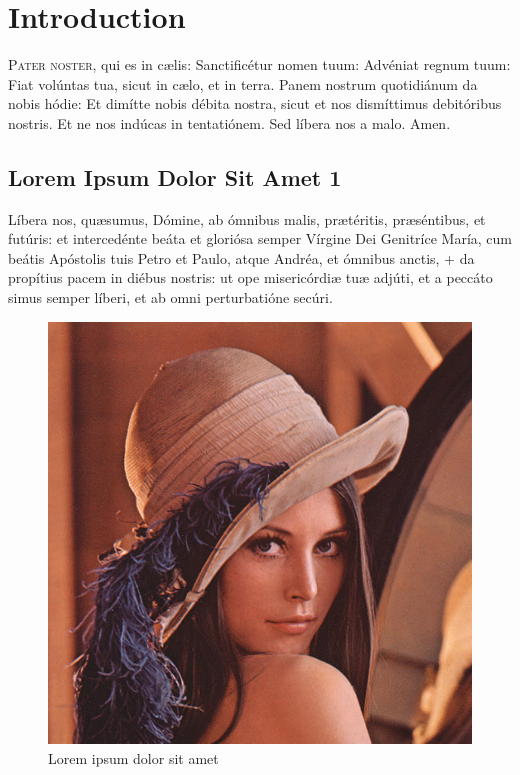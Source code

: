 \chapter{Introduction}\label{chap:introduction}

\lettrine{P}{ater noster}, qui es in cælis: Sanctificétur nomen tuum: Advéniat regnum tuum: Fiat volúntas tua, sicut in cælo, et in terra. Panem nostrum quotidiánum da nobis hódie: Et dimítte nobis débita nostra, sicut et nos dismíttimus debitóribus nostris. Et ne nos indúcas in tentatiónem. Sed líbera nos a malo. Amen.

\section{Lorem Ipsum Dolor Sit Amet 1}\label{introduction:sec:section_name_1}

Líbera nos, quæsumus, Dómine, ab ómnibus malis, prætéritis, præséntibus, et futúris: et intercedénte beáta et gloriósa semper Vírgine Dei Genitríce María, cum beátis Apóstolis tuis Petro et Paulo, atque Andréa, et ómnibus anctis, + da propítius pacem in diébus nostris: ut ope misericórdiæ tuæ adjúti, et a peccáto simus semper líberi, et ab omni perturbatióne secúri.

\begin{figure}
\includegraphics[width=\textwidth]{figs/introduction/lena}
\caption{Lorem ipsum dolor sit amet}
\label{introduction:fig:figure_name_1}
\end{figure}


